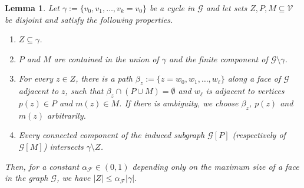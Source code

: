 \documentclass[10pt]{article}
\newcommand{\G}{\mathcal{G}}
\newcommand{\V}{\mathcal{V}}
\newtheorem{lemma}[theorem]{Lemma}
\begin{document}
\begin{lemma}\label{lemma:topological-lemma}
	Let $\gamma := \{v_0, v_1, \dots, v_k = v_0\}$ be a cycle in $\G$ and let sets $Z, P, M \subseteq \V$ be disjoint and satisfy the following properties.
	\begin{enumerate}
		\item $Z \subseteq \gamma$.
		\item $P$ and $M$ are contained in the union of $\gamma$ and the finite component of $\G \setminus \gamma$.
		\item For every $z \in Z$, there is a path $\beta_z := \{z = w_0, w_1, \dots, w_\ell\}$ along a face of $\G$ adjacent to $z$, such that $\beta_z \cap (P \cup M) = \emptyset$ and $w_\ell$ is adjacent to vertices $p(z) \in P$ and $m(z) \in M$. If there is ambiguity, we choose $\beta_z$, $p(z)$ and $m(z)$ arbitrarily.
		\item Every connected component of the induced subgraph $\G[P]$ (respectively of $\G[M]$) intersects $\gamma \setminus Z$.
	\end{enumerate}
	Then, for a constant $\alpha_{\mathcal{F}} \in (0,1)$ depending only on the maximum size of a face in the graph $\G$, we have $|Z| \leq \alpha_{\mathcal{F}} |\gamma|$.
\end{lemma}
\end{document}
